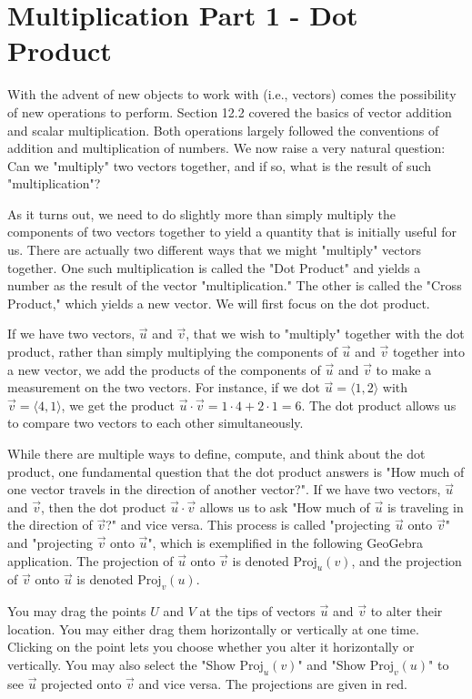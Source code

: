 \documentclass{ximera}
\begin{document}
\section{Multiplication Part 1 - Dot Product}

With the advent of new objects to work with (i.e., vectors) comes the possibility of new operations to perform. Section 12.2 covered the basics of vector addition and scalar multiplication. Both operations largely followed the conventions of addition and multiplication of numbers. We now raise a very natural question: Can we "multiply" two vectors together, and if so, what is the result of such "multiplication"?

As it turns out, we need to do slightly more than simply multiply the components of two vectors together to yield a quantity that is initially useful for us. There are actually two different ways that we might "multiply" vectors together. One such multiplication is called the "Dot Product" and yields a number as the result of the vector "multiplication." The other is called the "Cross Product," which yields a new vector. We will first focus on the dot product.

If we have two vectors, $\vec u$ and $\vec v$, that we wish to "multiply" together with the dot product, rather than simply multiplying the components of $\vec u$ and $\vec v$ together into a new vector, we add the products of the components of $\vec u$ and $\vec v$ to make a measurement on the two vectors. For instance, if we dot $\vec u=\langle 1,2\rangle$ with $\vec v=\langle 4,1\rangle$, we get the product $\vec u\cdot\vec v=1\cdot 4+2\cdot 1=6$. The dot product allows us to compare two vectors to each other simultaneously.

While there are multiple ways to define, compute, and think about the dot product, one fundamental question that the dot product answers is "How much of one vector travels in the direction of another vector?". If we have two vectors, $\vec u$ and $\vec v$, then the dot product $\vec u\cdot\vec v$ allows us to ask "How much of $\vec u$ is traveling in the direction of $\vec v$?" and vice versa. This process is called "projecting $\vec u$ onto $\vec v$" and "projecting $\vec v$ onto $\vec u$", which is exemplified in the following GeoGebra application. The projection of $\vec u$ onto $\vec v$ is denoted $\text{Proj}_u(v)$, and the projection of $\vec v$ onto $\vec u$ is denoted $\text{Proj}_v(u)$.

You may drag the points $U$ and $V$ at the tips of vectors $\vec u$ and $\vec v$ to alter their location. You may either drag them horizontally or vertically at one time. Clicking on the point lets you choose whether you alter it horizontally or vertically. You may also select the "Show $\text{Proj}_u(v)$" and "Show $\text{Proj}_v(u)$" to see $\vec u$ projected onto $\vec v$ and vice versa. The projections are given in red.
\end{document}
